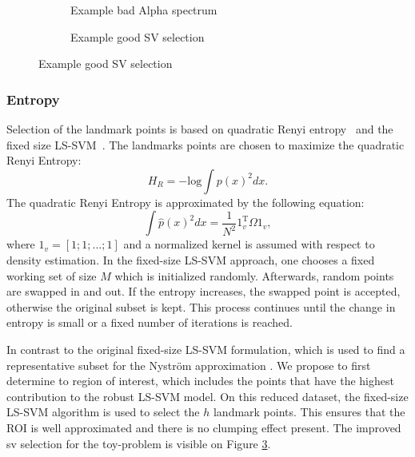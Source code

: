 \documentclass[preprint,12pt]{elsarticle}
\begin{document}
\begin{figure}[h]
	\centering
	\begin{subfigure}[b]{0.3\textwidth}
		\label{fig:BadAlpha}
		\caption{Example bad Alpha spectrum}
	\end{subfigure}
	\begin{subfigure}[b]{0.3\textwidth}
		\label{fig:GoodPruning}
		\caption{Example good SV selection}
	\end{subfigure}
\end{figure}

\subsubsection{Entropy}
Selection of the landmark points is based on quadratic Renyi entropy~\cite{girolami2002orthogonal} and the fixed size LS-SVM~\cite{suykens2002least}. The landmarks points are chosen to maximize the quadratic Renyi Entropy:
\begin{equation}
H_R = -\mathrm{log}\int p(x)^2 dx.
\end{equation}
The quadratic Renyi Entropy is approximated by the following equation\cite{girolami2002orthogonal}:
\begin{equation}
\int \hat{p}(x)^2dx = \frac{1}{N^2} 1_v^\mathrm{T}\Omega 1_v,
\end{equation}
where $1_v = [1;1;...;1]$ and a normalized kernel is assumed with respect to density estimation. In the fixed-size LS-SVM approach, one chooses a fixed working set of size $M$ which is initialized randomly. Afterwards, random points are swapped in and out. If the entropy increases, the swapped point is accepted, otherwise the original subset is kept. This process continues until the change in entropy is small or a fixed number of iterations is reached. 

In contrast to the original fixed-size LS-SVM formulation, which is used to find a representative subset for the Nystr\"{o}m approximation \cite{suykens2002least}. We propose to first determine to region of interest, which includes the points that have the highest contribution to the robust LS-SVM model. On this reduced dataset, the fixed-size LS-SVM algorithm is used to select the $h$ landmark points. This ensures that the ROI is well approximated and there is no clumping effect present. The improved sv selection for the toy-problem is visible on Figure \ref{fig:GoodPruning}.
\end{document}
